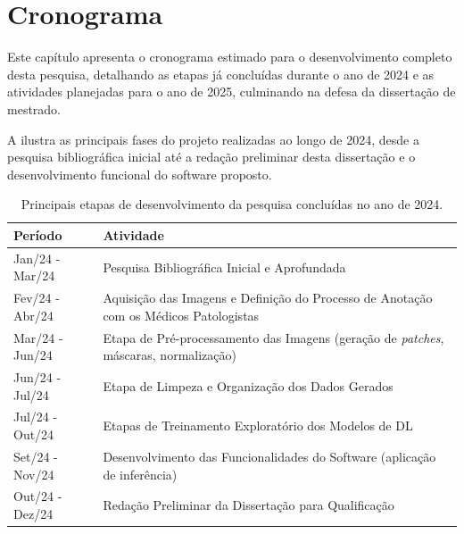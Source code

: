 \chapter{Cronograma}\label{chp:cronograma}

Este capítulo apresenta o cronograma estimado para o desenvolvimento completo desta pesquisa, detalhando as etapas já concluídas durante o ano de 2024 e as atividades planejadas para o ano de 2025, culminando na defesa da dissertação de mestrado.

A  ilustra as principais fases do projeto realizadas ao longo de 2024, desde a pesquisa bibliográfica inicial até a redação preliminar desta dissertação e o desenvolvimento funcional do software proposto.


\begin{table}[!htp]
\centering
\caption[Cronograma das atividades realizadas em 2024.]{Principais etapas de desenvolvimento da pesquisa concluídas no ano de 2024.}
\label{tab:cronograma_2024}
\begin{tabular}{lp{10cm}} %
\toprule
\textbf{Período} & \textbf{Atividade} \\ \midrule
Jan/24 - Mar/24 & Pesquisa Bibliográfica Inicial e Aprofundada \\
Fev/24 - Abr/24 & Aquisição das Imagens e Definição do Processo de Anotação com os Médicos Patologistas \\
Mar/24 - Jun/24 & Etapa de Pré-processamento das Imagens (geração de \textit{patches}, máscaras, normalização) \\
Jun/24 - Jul/24 & Etapa de Limpeza e Organização dos Dados Gerados \\
Jul/24 - Out/24 & Etapas de Treinamento Exploratório dos Modelos de DL \\
Set/24 - Nov/24 & Desenvolvimento das Funcionalidades do Software (aplicação de inferência) \\
Out/24 - Dez/24 & Redação Preliminar da Dissertação para Qualificação \\ \bottomrule
\end{tabular}
\end{table}

